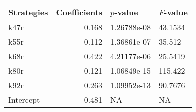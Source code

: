 \begin{tabular}{lrll}
\toprule
Strategies &  Coefficients &    $p$-value & $F$-value \\
\midrule
      k47r &         0.168 &  1.26788e-08 &   43.1534 \\
      k55r &         0.112 &  1.36861e-07 &    35.512 \\
      k68r &         0.422 &  4.21177e-06 &   25.5419 \\
      k80r &         0.121 &  1.06849e-15 &   115.422 \\
      k92r &         0.263 &  1.09952e-13 &   90.7676 \\
 Intercept &        -0.481 &           NA &        NA \\
\bottomrule
\end{tabular}
